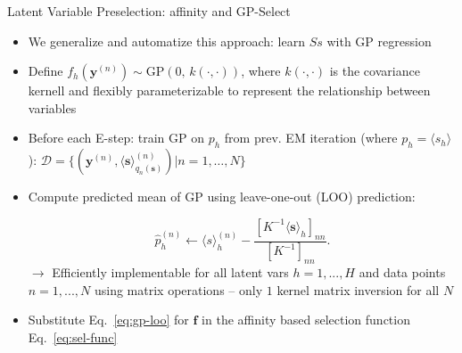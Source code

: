 \documentclass[final]{beamer}
\renewcommand{\vec}[1]{{\mathbf{#1}}}
\newcommand{\highlight}[1]{\textcolor{blocktbgn}{#1}}
\renewcommand{\vec}[1]{{\mathbf{#1}}}
\newcommand{\Ss}{\mathcal{S}}
\begin{document}
\begin{frame}{}
\begin{columns}[t]
\begin{column}{.35\linewidth}
\begin{block}{Latent Variable Preselection: affinity and GP-Select}
\begin{itemize}
            \item We \highlight{generalize and automatize} this approach:  %
                \highlight{learn $Ss$} with \highlight{GP regression} %
            \item Define $f_h(\vec{y}^{(n)}) \sim \text{GP}\left(0, \, k(\cdot,\cdot) \right)$, where $k(\cdot, \cdot)$ is the covariance kernell and flexibly parameterizable to represent the relationship between variables

            \item Before each E-step: 
                train GP on $p_h$ from prev. EM iteration (where $p_h = \langle s_h \rangle$): 
            $\mathcal{D} = \{ (\vec{y}^{(n)}, \langle\vec{s}\rangle^{(n)}_{q_n(\vec{s})}) | n = 1,\dots, N \}$

            \item \highlight{Compute} predicted mean of GP using \highlight{leave-one-out (LOO) prediction}:

                \vspace{-.2cm}  %
                \begin{equation}\label{eq:gp-loo}
                \hat{p}_{h}^{(n)} \leftarrow   
                \langle s \rangle_h^{(n)} - \frac{ [ K^{-1} \langle\vec{s}\rangle_{h} ]_{nn} }{ [ K^{-1} ]_{nn} }.
                \end{equation}
                \highlight{$\rightarrow$ Efficiently implementable} for all latent vars $h=1,...,H$ and data points $n=1,...,N$ using matrix operations -- only $1$ kernel matrix inversion for all $N$
            \item \highlight{Substitute} Eq.~\eqref{eq:gp-loo} for $\vec{f}$ in the affinity based selection function Eq.~\eqref{eq:sel-func} %


\end{itemize}
\end{block}
\end{column}
\end{columns}
\end{frame}
\end{document}
